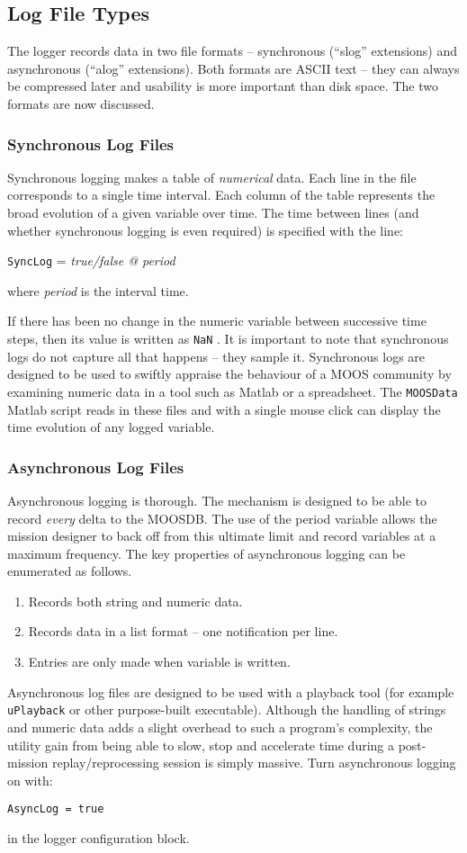 \documentclass[a4paper,10pt]{article}
\newcommand{\Code}[1]{\texttt{#1} }
\newcommand{\code}[1]{\Code{#1} }
\begin{document}
\subsection{Log File Types}\label{sec:LogTypes}
The logger records data in two file formats -- synchronous
(``slog'' extensions) and asynchronous (``alog'' extensions). Both
formats are ASCII text -- they can always be compressed later and
usability is more important than disk space. The two formats are
now discussed.

\subsubsection{Synchronous Log Files}
Synchronous logging makes a table of {\em{numerical}} data. Each
line in the file corresponds to a single time interval. Each
column of the table represents the broad evolution of a given
variable over time. The time between lines (and whether
synchronous logging is even required) is specified with the line:
\begin{center}
\code{SyncLog}= {\it{true/false @ period}}
\end{center}
where {\it{period}} is the interval time.

If there has been no change in the numeric variable between
successive time steps, then its value is written as \code{NaN}. It
is important to note that synchronous logs do not capture all that
happens -- they sample it. Synchronous logs are designed to be used
to swiftly appraise the behaviour of a MOOS community by examining
numeric data in a tool such as Matlab or a spreadsheet. The
\code{MOOSData} Matlab script reads in these files and with a
single mouse click can display the time evolution of any logged
variable.


\subsubsection{Asynchronous Log Files}
Asynchronous logging is thorough. The mechanism is designed to be
able to record {\em{every}} delta to the MOOSDB. The use of the
period variable allows the mission designer to back off from this
ultimate limit and record variables at a maximum frequency. The
key properties of asynchronous logging can be enumerated as follows.
\begin{enumerate}
\item Records both string and numeric data.
\item Records data in a list format -- one notification per line.
\item Entries are only made when variable is written.
\end{enumerate}
Asynchronous log files are designed to be used with a playback
tool (for example \code{uPlayback} or other purpose-built
executable). Although the handling of strings and numeric data
adds a slight overhead to such a program's complexity, the utility
gain from being able to slow, stop and accelerate time during a
post-mission replay/reprocessing session is simply massive. Turn asynchronous logging on with:
\begin{center}
\code{AsyncLog = true}
\end{center}
in the logger configuration block.
\end{document}
